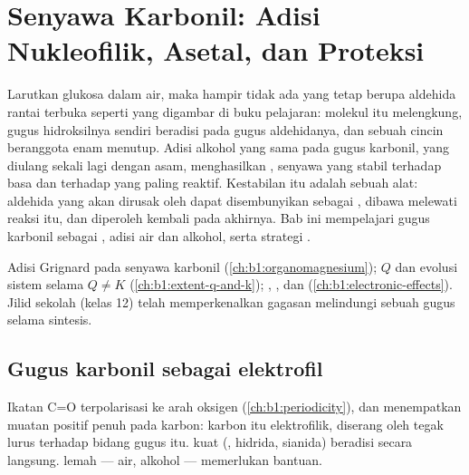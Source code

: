 \chapter{Senyawa Karbonil: Adisi Nukleofilik, Asetal, dan Proteksi}\label{ch:b1:acetals-protection}

Larutkan glukosa dalam air, maka hampir tidak ada yang tetap berupa
aldehida rantai terbuka seperti yang digambar di buku pelajaran: molekul
itu melengkung, gugus hidroksilnya sendiri beradisi pada gugus
aldehidanya, dan sebuah cincin beranggota enam menutup. Adisi alkohol
yang sama pada gugus karbonil, yang diulang sekali lagi dengan 
asam, menghasilkan , senyawa yang stabil terhadap basa dan terhadap
 yang paling reaktif. Kestabilan itu adalah sebuah alat: aldehida
yang akan dirusak oleh  dapat disembunyikan sebagai
, dibawa melewati reaksi itu, dan diperoleh kembali pada akhirnya.
Bab ini mempelajari gugus karbonil sebagai , adisi air dan
alkohol, serta strategi .

\begin{recall}
Adisi Grignard pada senyawa karbonil (\cref{ch:b1:organomagnesium});
 $Q$ dan evolusi sistem selama $Q \neq K$
(\cref{ch:b1:extent-q-and-k}); , , dan 
(\cref{ch:b1:electronic-effects}). Jilid sekolah (kelas 12) telah
memperkenalkan gagasan melindungi sebuah gugus selama sintesis.
\end{recall}

\section{Gugus karbonil sebagai elektrofil}

Ikatan C=O terpolarisasi ke arah oksigen (\cref{ch:b1:periodicity}), dan
  menempatkan muatan positif penuh pada
karbon: karbon itu elektrofilik, diserang oleh  tegak lurus
terhadap bidang gugus itu.  kuat (, hidrida,
sianida) beradisi secara langsung.  lemah --- air, alkohol ---
memerlukan bantuan.

